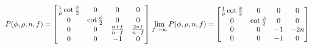 
$$
P(\phi, \rho, n, f)=
\left[
\begin{matrix}
\frac{1}{\rho}\cot{\frac{\phi}{2}} & 0 & 0 & 0\\
0 & \cot{\frac{\phi}{2}} & 0 & 0\\
0 & 0 & \frac{n + f}{n - f} & \frac{2 n f}{n - f}\\
0 & 0 & -1 & 0\\
\end{matrix}
\right]\\

\lim_{f\rightarrow\infty}P(\phi, \rho, n, f)=
\left[
\begin{matrix}
\frac{1}{\rho}\cot{\frac{\phi}{2}} & 0 & 0 & 0\\
0 & \cot{\frac{\phi}{2}} & 0 & 0\\
0 & 0 & -1 & -2n\\
0 & 0 & -1 & 0\\
\end{matrix}
\right]\\
$$
